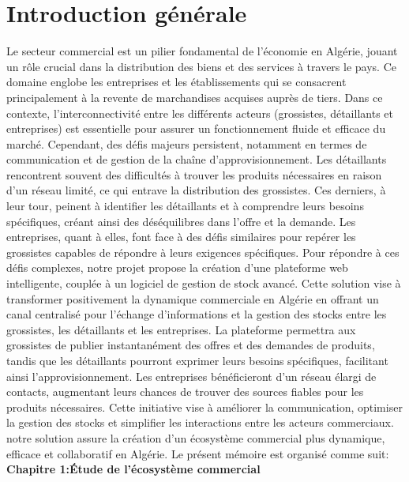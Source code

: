 \documentclass[edit,12pt,a4paper,ChapStyle,oneside,doubleinterligne]{report}
\begin{document}
\chapter*{Introduction générale}
Le secteur commercial est un pilier fondamental de l'économie en Algérie, jouant un rôle crucial dans la distribution des biens et des services à travers le pays. Ce domaine englobe les entreprises et les établissements qui se consacrent principalement à la revente de marchandises acquises auprès de tiers. Dans ce contexte, l'interconnectivité entre les différents acteurs (grossistes, détaillants et entreprises) est essentielle pour assurer un fonctionnement fluide et efficace du marché. Cependant, des défis majeurs persistent, notamment en termes de communication et de gestion de la chaîne d'approvisionnement.
\newline \phantom{hassane} \newline
Les détaillants rencontrent souvent des difficultés à trouver les produits nécessaires en raison d'un réseau limité, ce qui entrave la distribution des grossistes. Ces derniers, à leur tour, peinent à identifier les détaillants et à comprendre leurs besoins spécifiques, créant ainsi des déséquilibres dans l'offre et la demande. Les entreprises, quant à elles, font face à des défis similaires pour repérer les grossistes capables de répondre à leurs exigences spécifiques.
\newline \phantom{hassane} \newline
Pour répondre à ces défis complexes, notre projet propose la création d'une plateforme web intelligente, couplée à un logiciel de gestion de stock avancé. Cette solution vise à transformer positivement la dynamique commerciale en Algérie en offrant un canal centralisé pour l'échange d'informations et la gestion des stocks entre les grossistes, les détaillants et les entreprises. La plateforme permettra aux grossistes de publier instantanément des offres et des demandes de produits, tandis que les détaillants pourront exprimer leurs besoins spécifiques, facilitant ainsi l'approvisionnement. Les entreprises bénéficieront d'un réseau élargi de contacts, augmentant leurs chances de trouver des sources fiables pour les produits nécessaires.
\newline \phantom{hassane} \newline
Cette initiative vise à améliorer la communication, optimiser la gestion des stocks et simplifier les interactions entre les acteurs commerciaux. notre solution assure la création d'un écosystème commercial plus dynamique, efficace et collaboratif en Algérie.
\newpage
Le présent mémoire est organisé comme suit:
 \newline
\newline\phantom{Ch}\textbf{Chapitre 1:Étude de l'écosystème commercial }
\end{document}
